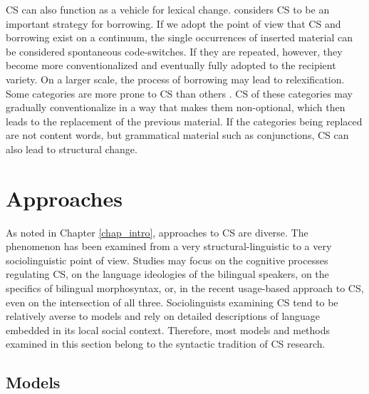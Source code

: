 \documentclass[output=paper]{langscibook}
\begin{document}
CS can also function as a vehicle for lexical change. \textcite{thomason2001contact} considers CS to be an important strategy for borrowing. If we adopt the point of view that CS and borrowing exist on a continuum, the single occurrences of inserted material can be considered spontaneous code-switches. If they are repeated, however, they become more conventionalized and eventually fully adopted to the recipient variety. On a larger scale, the process of borrowing may lead to relexification. Some categories are more prone to CS than others \parencite[133]{matras2009language}. CS of these categories may gradually conventionalize in a way that makes them non-optional, which then leads to the replacement of the previous material. If the categories being replaced are not content words, but grammatical material such as conjunctions, CS can also lead to structural change.

\section{Approaches}

As noted in Chapter \ref{chap_intro}, approaches to CS are diverse. The phenomenon has been examined from a very structural-linguistic to a very sociolinguistic point of view. Studies may focus on the cognitive processes regulating CS, on the language ideologies of the bilingual speakers, on the specifics of bilingual morphosyntax, or, in the recent usage-based approach to CS, even on the intersection of all three. Sociolinguists examining CS tend to be relatively averse to models and rely on detailed descriptions of  language embedded in its local social context. Therefore, most models and methods examined in this section belong to the syntactic tradition of CS research.

\subsection{Models} \label{subsec-models}
\end{document}
